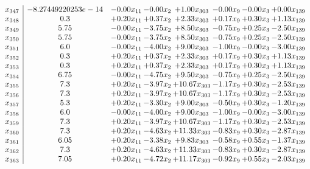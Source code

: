 \documentclass[8pt]{article}
\begin{document}
\[\begin{array}{c| c c@{\hskip 2pt} c@{\hskip 2pt} c@{\hskip 2pt} c@{\hskip 2pt} c@{\hskip 2pt} c@{\hskip 2pt} }
 x_{347}   &  -8.27449220253e-14 & -0.00 x_{11} & -0.00 x_{2} & +  1.00 x_{303} & -0.00 x_{9} & -0.00 x_{3} & +  0.00 x_{139}\\
 x_{348}   &  0.3 & +  0.20 x_{11} & +  0.37 x_{2} & +  2.33 x_{303} & +  0.17 x_{9} & +  0.30 x_{3} & +  1.13 x_{139}\\
 x_{349}   &  5.75 & -0.00 x_{11} & -3.75 x_{2} & +  8.50 x_{303} & -0.75 x_{9} & +  0.25 x_{3} & -2.50 x_{139}\\
 x_{350}   &  5.75 & -0.00 x_{11} & -3.75 x_{2} & +  8.50 x_{303} & -0.75 x_{9} & +  0.25 x_{3} & -2.50 x_{139}\\
 x_{351}   &  6.0 & -0.00 x_{11} & -4.00 x_{2} & +  9.00 x_{303} & -1.00 x_{9} & -0.00 x_{3} & -3.00 x_{139}\\
 x_{352}   &  0.3 & +  0.20 x_{11} & +  0.37 x_{2} & +  2.33 x_{303} & +  0.17 x_{9} & +  0.30 x_{3} & +  1.13 x_{139}\\
 x_{353}   &  0.3 & +  0.20 x_{11} & +  0.37 x_{2} & +  2.33 x_{303} & +  0.17 x_{9} & +  0.30 x_{3} & +  1.13 x_{139}\\
 x_{354}   &  6.75 & -0.00 x_{11} & -4.75 x_{2} & +  9.50 x_{303} & -0.75 x_{9} & +  0.25 x_{3} & -2.50 x_{139}\\
 x_{355}   &  7.3 & +  0.20 x_{11} & -3.97 x_{2} & + 10.67 x_{303} & -1.17 x_{9} & +  0.30 x_{3} & -2.53 x_{139}\\
 x_{356}   &  7.3 & +  0.20 x_{11} & -3.97 x_{2} & + 10.67 x_{303} & -1.17 x_{9} & +  0.30 x_{3} & -2.53 x_{139}\\
 x_{357}   &  5.3 & +  0.20 x_{11} & -3.30 x_{2} & +  9.00 x_{303} & -0.50 x_{9} & +  0.30 x_{3} & -1.20 x_{139}\\
 x_{358}   &  6.0 & -0.00 x_{11} & -4.00 x_{2} & +  9.00 x_{303} & -1.00 x_{9} & -0.00 x_{3} & -3.00 x_{139}\\
 x_{359}   &  7.3 & +  0.20 x_{11} & -3.97 x_{2} & + 10.67 x_{303} & -1.17 x_{9} & +  0.30 x_{3} & -2.53 x_{139}\\
 x_{360}   &  7.3 & +  0.20 x_{11} & -4.63 x_{2} & + 11.33 x_{303} & -0.83 x_{9} & +  0.30 x_{3} & -2.87 x_{139}\\
 x_{361}   &  6.05 & +  0.20 x_{11} & -3.38 x_{2} & +  9.83 x_{303} & -0.58 x_{9} & +  0.55 x_{3} & -1.37 x_{139}\\
 x_{362}   &  7.3 & +  0.20 x_{11} & -4.63 x_{2} & + 11.33 x_{303} & -0.83 x_{9} & +  0.30 x_{3} & -2.87 x_{139}\\
 x_{363}   &  7.05 & +  0.20 x_{11} & -4.72 x_{2} & + 11.17 x_{303} & -0.92 x_{9} & +  0.55 x_{3} & -2.03 x_{139}\\

\end{array}\]
\end{document}
